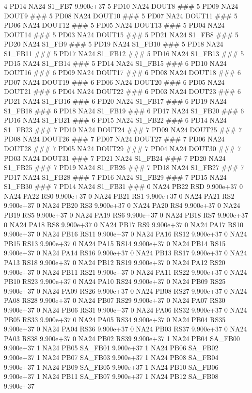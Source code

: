 4 PD14 NA24 S1_FB7 9.900e+37 
5 PD10 NA24 DOUT8 ### 
5 PD09 NA24 DOUT9 ### 
5 PD08 NA24 DOUT10 ### 
5 PD07 NA24 DOUT11 ### 
5 PD06 NA24 DOUT12 ### 
5 PD05 NA24 DOUT13 ### 
5 PD04 NA24 DOUT14 ### 
5 PD03 NA24 DOUT15 ### 
5 PD21 NA24 S1_FB8 ### 
5 PD20 NA24 S1_FB9 ### 
5 PD19 NA24 S1_FB10 ### 
5 PD18 NA24 S1_FB11 ### 
5 PD17 NA24 S1_FB12 ### 
5 PD16 NA24 S1_FB13 ### 
5 PD15 NA24 S1_FB14 ### 
5 PD14 NA24 S1_FB15 ### 
6 PD10 NA24 DOUT16 ### 
6 PD09 NA24 DOUT17 ### 
6 PD08 NA24 DOUT18 ### 
6 PD07 NA24 DOUT19 ### 
6 PD06 NA24 DOUT20 ### 
6 PD05 NA24 DOUT21 ### 
6 PD04 NA24 DOUT22 ### 
6 PD03 NA24 DOUT23 ### 
6 PD21 NA24 S1_FB16 ### 
6 PD20 NA24 S1_FB17 ### 
6 PD19 NA24 S1_FB18 ### 
6 PD18 NA24 S1_FB19 ### 
6 PD17 NA24 S1_FB20 ### 
6 PD16 NA24 S1_FB21 ### 
6 PD15 NA24 S1_FB22 ### 
6 PD14 NA24 S1_FB23 ### 
7 PD10 NA24 DOUT24 ### 
7 PD09 NA24 DOUT25 ### 
7 PD08 NA24 DOUT26 ### 
7 PD07 NA24 DOUT27 ### 
7 PD06 NA24 DOUT28 ### 
7 PD05 NA24 DOUT29 ### 
7 PD04 NA24 DOUT30 ### 
7 PD03 NA24 DOUT31 ### 
7 PD21 NA24 S1_FB24 ### 
7 PD20 NA24 S1_FB25 ### 
7 PD19 NA24 S1_FB26 ### 
7 PD18 NA24 S1_FB27 ### 
7 PD17 NA24 S1_FB28 ### 
7 PD16 NA24 S1_FB29 ### 
7 PD15 NA24 S1_FB30 ### 
7 PD14 NA24 S1_FB31 ### 
0 NA24 PB22 RSD 9.900e+37 
0 NA24 PA22 RS0 9.900e+37 
0 NA24 PB21 RS1 9.900e+37 
0 NA24 PA21 RS2 9.900e+37 
0 NA24 PB20 RS3 9.900e+37 
0 NA24 PA20 RS4 9.900e+37 
0 NA24 PB19 RS5 9.900e+37 
0 NA24 PA19 RS6 9.900e+37 
0 NA24 PB18 RS7 9.900e+37 
0 NA24 PA18 RS8 9.900e+37 
0 NA24 PB17 RS9 9.900e+37 
0 NA24 PA17 RS10 9.900e+37 
0 NA24 PB16 RS11 9.900e+37 
0 NA24 PA16 RS12 9.900e+37 
0 NA24 PB15 RS13 9.900e+37 
0 NA24 PA15 RS14 9.900e+37 
0 NA24 PB14 RS15 9.900e+37 
0 NA24 PA14 RS16 9.900e+37 
0 NA24 PB13 RS17 9.900e+37 
0 NA24 PA13 RS18 9.900e+37 
0 NA24 PB12 RS19 9.900e+37 
0 NA24 PA12 RS20 9.900e+37 
0 NA24 PB11 RS21 9.900e+37 
0 NA24 PA11 RS22 9.900e+37 
0 NA24 PB10 RS23 9.900e+37 
0 NA24 PA10 RS24 9.900e+37 
0 NA24 PB09 RS25 9.900e+37 
0 NA24 PA09 RS26 9.900e+37 
0 NA24 PB08 RS27 9.900e+37 
0 NA24 PA08 RS28 9.900e+37 
0 NA24 PB07 RS29 9.900e+37 
0 NA24 PA07 RS30 9.900e+37 
0 NA24 PB06 RS31 9.900e+37 
0 NA24 PA06 RS32 9.900e+37 
0 NA24 PB05 RS33 9.900e+37 
0 NA24 PA05 RS34 9.900e+37 
0 NA24 PB04 RS35 9.900e+37 
0 NA24 PA04 RS36 9.900e+37 
0 NA24 PB03 RS37 9.900e+37 
0 NA24 PA03 RS38 9.900e+37 
0 NA24 PB02 RS39 9.900e+37 
1 NA24 PB04 SA_FB00 9.900e+37 
1 NA24 PB05 SA_FB01 9.900e+37 
1 NA24 PB06 SA_FB02 9.900e+37 
1 NA24 PB07 SA_FB03 9.900e+37 
1 NA24 PB08 SA_FB04 9.900e+37 
1 NA24 PB09 SA_FB05 9.900e+37 
1 NA24 PB10 SA_FB06 9.900e+37 
1 NA24 PB11 SA_FB07 9.900e+37 
1 NA24 PB12 SA_FB08 9.900e+37 
